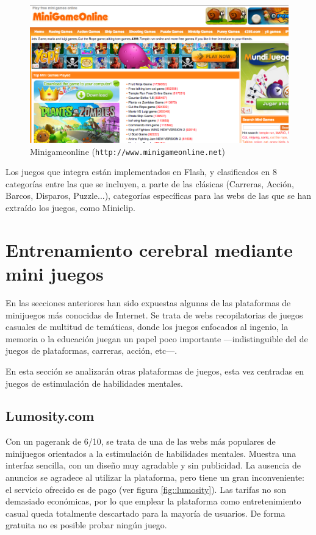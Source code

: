 \begin{figure}[h]
  \begin{center}
    \includegraphics[width=\textwidth]{images/minigameonline.png}
    \caption{Minigameonline ({\tt http://www.minigameonline.net})}
    \label{fig::minigameonline}
  \end{center}
\end{figure}

Los juegos que integra están implementados en Flash, y clasificados en 8 categorías entre las que se incluyen, a parte de las clásicas (Carreras, Acción, Barcos, Disparos, Puzzle...), categorías específicas para las webs de las que se han extraído los juegos, como Miniclip.

\section{Entrenamiento cerebral mediante mini juegos}
\label{sec::webs-de-brain}

En las secciones anteriores han sido expuestas algunas de las plataformas de minijuegos más conocidas de Internet. Se trata de webs recopilatorias de juegos casuales de multitud de temáticas, donde los juegos enfocados al ingenio, la memoria o la educación juegan un papel poco importante ---indistinguible del de juegos de plataformas, carreras, acción, etc---.

En esta sección se analizarán otras plataformas de juegos, esta vez centradas en juegos de estimulación de habilidades mentales.

\subsection*{Lumosity.com}

Con un pagerank de 6/10, se trata de una de las webs más populares de minijuegos orientados a la estimulación de habilidades mentales. Muestra una interfaz sencilla, con un diseño muy agradable y sin publicidad. La ausencia de anuncios se agradece al utilizar la plataforma, pero tiene un gran inconveniente: el servicio ofrecido es de pago (ver figura \ref{fig::lumosity}). Las tarifas no son demasiado económicas, por lo que emplear la plataforma como entretenimiento casual queda totalmente descartado para la mayoría de usuarios. De forma gratuita no es posible probar ningún juego.

